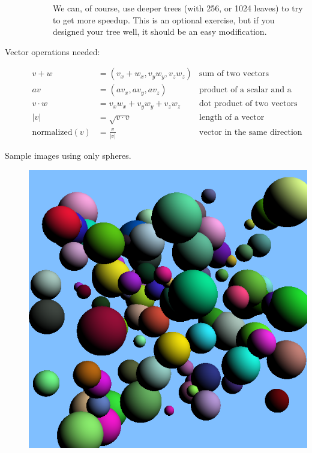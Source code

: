\documentclass{article}
\begin{document}
\begin{description}
\begin{description}
  We can, of course, use deeper trees (with 256, or 1024 leaves) to
  try to get more speedup.  This is an optional exercise, but if you
  designed your tree well, it should be an easy modification.

\end{description}


\item[Vector operations needed:]
  \begin{align*}
    v + w &= (v_x+w_x, v_yw_y, v_zw_z) &\mbox{sum of two vectors}\\
    av &= (av_x, av_y, av_z) & \mbox{product of a scalar and a
      vector}\\
    v \cdot w &= v_xw_x + v_yw_y + v_zw_z &\mbox{dot product of two
      vectors}\\
    |v| &= \sqrt{v\cdot v} &\mbox{length of a vector}\\
    \mbox{normalized}(v) &= \frac{v}{|v|} &\mbox{vector in the same
      direction with unit length}
    \end{align*}


\item[Sample images using only spheres.]\mbox{}

\begin{center}
      {\includegraphics[scale=0.5]{randomspheres.png}}


\end{center}
\end{description}
\end{document}
